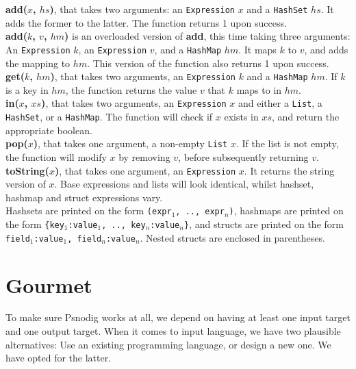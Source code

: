 \textbf{add($x$, $hs$)}, that takes two arguments: an \texttt{Expression} $x$ and a \texttt{HashSet} $hs$. It adds the former to the latter. The function returns 1 upon success. \\

\textbf{add($k$, $v$, $hm$)} is an overloaded version of \textbf{add}, this time taking three arguments: An \texttt{Expression} $k$, an \texttt{Expression} $v$, and a \texttt{HashMap} $hm$. It maps $k$ to $v$, and adds the mapping to $hm$. This version of the function also returns 1 upon success. \\

\textbf{get($k$, $hm$)}, that takes two arguments, an \texttt{Expression} $k$ and a \texttt{HashMap} $hm$. If $k$ is a key in $hm$, the function returns the value $v$ that $k$ maps to in $hm$. \\

\textbf{in($x$, $xs$)}, that takes two arguments, an \texttt{Expression} $x$ and either a \texttt{List}, a \texttt{HashSet}, or a \texttt{HashMap}. The function will check if $x$ exists in $xs$, and return the appropriate boolean. \\

\textbf{pop($x$)}, that takes one argument, a non-empty \texttt{List} $x$. If the list is not empty, the function will modify $x$ by removing $v$, before subsequently returning $v$. \\

\textbf{toString($x$)}, that takes one argument, an \texttt{Expression} $x$. It returns the string version of $x$. Base expressions and lists will look identical, whilst hashset, hashmap and struct expressions vary. \\

Hashsets are printed on the form \texttt{(expr$_1$, .., expr$_n$)}, hashmaps are printed on the form \texttt{\{key$_1$:value$_1$, .., key$_n$:value$_n$\}}, and structs are printed on the form \texttt{field$_1$:value$_1$, field$_n$:value$_n$}. Nested structs are enclosed in parentheses.

\section{Gourmet}

To make sure Psnodig works at all, we depend on having at least one input target and one output target. When it comes to input language, we have two plausible alternatives: Use an existing programming language, or design a new one. We have opted for the latter. \\

